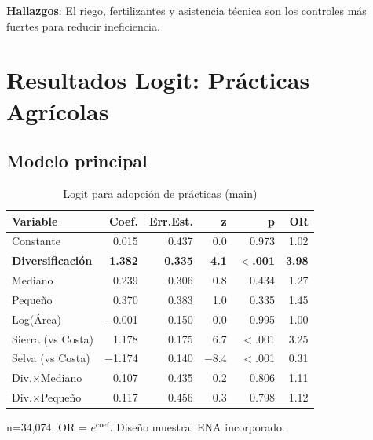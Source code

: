 \documentclass[11pt,a4paper]{article}
\begin{document}
\textbf{Hallazgos}: El riego, fertilizantes y asistencia técnica son los controles más fuertes para reducir ineficiencia.

\section{Resultados Logit: Prácticas Agrícolas}

\subsection{Modelo principal}

\begin{table}[H]
\centering
\caption{Logit para adopción de prácticas (main)}
\label{tab:logit_main}
\begin{threeparttable}
\small
\begin{tabular}{lrrrrr}
\toprule
\textbf{Variable} & \textbf{Coef.} & \textbf{Err.Est.} & \textbf{z} & \textbf{p} & \textbf{OR} \\
\midrule
Constante & 0.015 & 0.437 & 0.0 & 0.973 & 1.02 \\
\textbf{Diversificación} & \textbf{1.382} & \textbf{0.335} & \textbf{4.1} & \textbf{$<$.001} & \textbf{3.98} \\
Mediano & 0.239 & 0.306 & 0.8 & 0.434 & 1.27 \\
Pequeño & 0.370 & 0.383 & 1.0 & 0.335 & 1.45 \\
Log(Área) & $-$0.001 & 0.150 & 0.0 & 0.995 & 1.00 \\
Sierra (vs Costa) & 1.178 & 0.175 & 6.7 & $<$.001 & 3.25 \\
Selva (vs Costa) & $-$1.174 & 0.140 & $-$8.4 & $<$.001 & 0.31 \\
\midrule
Div.$\times$Mediano & 0.107 & 0.435 & 0.2 & 0.806 & 1.11 \\
Div.$\times$Pequeño & 0.117 & 0.456 & 0.3 & 0.798 & 1.12 \\
\bottomrule
\end{tabular}
\begin{tablenotes}
\footnotesize
\item n=34,074. OR = $e^{\text{coef}}$. Diseño muestral ENA incorporado.
\end{tablenotes}
\end{threeparttable}
\end{table}
\end{document}
